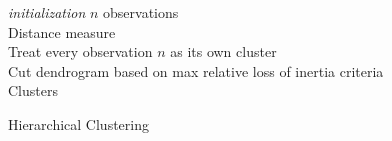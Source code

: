\documentclass[../thesis.tex]{subfiles}
\begin{document}
\begin{algorithm}[H]{
\SetAlgoLined
\textit{initialization}\;
\hspace*{0,5cm}$n$ observations\\
\hspace*{0,5cm}Distance measure\\
\hspace*{0,5cm}Treat every observation $n$ as its own cluster\\
}
Cut dendrogram based on max relative loss of inertia criteria\\
\Return Clusters
\caption{Hierarchical Clustering}
\end{algorithm}\vspace*{0,5cm}
\end{document}
